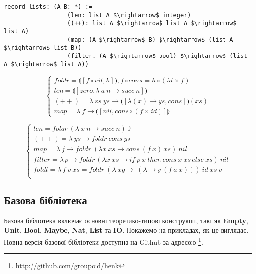 \documentclass{article}
\begin{document}
\begin{lstlisting}[mathescape=true]
           record lists: (A B: *) :=
                  (len: list A $\rightarrow$ integer)
                  ((++): list A $\rightarrow$ list A $\rightarrow$ list A)
                  (map: (A $\rightarrow$ B) $\rightarrow$ (list A $\rightarrow$ list B))
                  (filter: (A $\rightarrow$ bool) $\rightarrow$ (list A $\rightarrow$ list A))
\end{lstlisting}

$$
\begin{cases}
foldr = \llparenthesis [ f \circ nil , h] \rrparenthesis, f \circ cons = h \circ (id \times f)\\
len = \llparenthesis [ zero, \lambda\ a\ n \rightarrow succ\ n ] \rrparenthesis \\
(++) = \lambda\ xs\ ys \rightarrow \llparenthesis [ \lambda (x) \rightarrow ys, cons ] \rrparenthesis (xs) \\
map = \lambda\ f \rightarrow \llparenthesis [ nil, cons \circ (f \times id)] \rrparenthesis
\end{cases}
$$

$$
\begin{cases}
len = foldr\ (\lambda\ x\ n \rightarrow succ\ n)\ 0\\
(++) = \lambda\ ys \rightarrow foldr\ cons\ ys\\
map = \lambda\ f \rightarrow foldr\ (\lambda x\ xs \rightarrow cons\ (f\ x)\ xs)\ nil\\
filter = \lambda\ p \rightarrow foldr\ (\lambda x\ xs \rightarrow if\ p\ x\ then\ cons\ x\ xs\ else\ xs)\ nil\\
foldl = \lambda\ f\ v\ xs = foldr\ (\lambda\ xg\rightarrow\ (\lambda \rightarrow g\ (f\ a\ x)))\ id\ xs\ v\\
\end{cases}
$$

\subsection{Базова бібліотека}
Базова бібліотека включає основні теоретико-типові конструкції, такі як
{\bf Empty}, {\bf Unit}, {\bf Bool}, {\bf Maybe}, {\bf Nat}, {\bf List} та {\bf IO}.
Покажемо на прикладах, як це виглядає. Повна версія базової бібліотеки доступна на Github
за адресою \footnote{http://github.com/groupoid/henk}.
\end{document}
